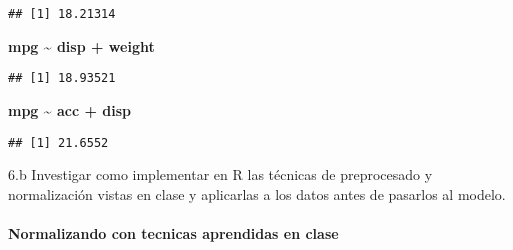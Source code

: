 \documentclass[]{article}
\newenvironment{Shaded}{\begin{snugshade}}{\end{snugshade}}
\newcommand{\DataTypeTok}[1]{\textcolor[rgb]{0.13,0.29,0.53}{#1}}
\newcommand{\KeywordTok}[1]{\textcolor[rgb]{0.13,0.29,0.53}{\textbf{#1}}}
\newcommand{\NormalTok}[1]{#1}
\newcommand{\OperatorTok}[1]{\textcolor[rgb]{0.81,0.36,0.00}{\textbf{#1}}}
\newcommand{\StringTok}[1]{\textcolor[rgb]{0.31,0.60,0.02}{#1}}
\let\oldparagraph\paragraph
\renewcommand{\paragraph}[1]{\oldparagraph{#1}\mbox{}}
\begin{document}
\begin{verbatim}
## [1] 18.21314
\end{verbatim}

\textbf{mpg \textasciitilde{} disp + weight}

\begin{Shaded}
\end{Shaded}

\begin{verbatim}
## [1] 18.93521
\end{verbatim}

\textbf{mpg \textasciitilde{} acc + disp}

\begin{Shaded}
\end{Shaded}

\begin{verbatim}
## [1] 21.6552
\end{verbatim}

6.b Investigar como implementar en R las técnicas de preprocesado y
normalización vistas en clase y aplicarlas a los datos antes de pasarlos
al modelo.

\hypertarget{normalizando-con-tecnicas-aprendidas-en-clase}{%
\paragraph{\texorpdfstring{\textbf{Normalizando con tecnicas aprendidas
en
clase}}{Normalizando con tecnicas aprendidas en clase}}\label{normalizando-con-tecnicas-aprendidas-en-clase}}
\end{document}
